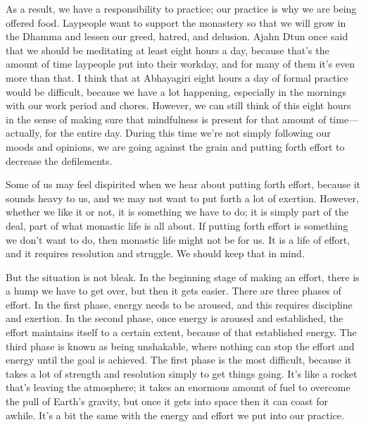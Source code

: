 As a result, we have a responsibility to practice; our practice is why 
we are being offered food. Laypeople want to support the monastery so 
that we will grow in the Dhamma and lessen our greed, hatred, and 
delusion. Ajahn Dtun once said that we should be meditating at least 
eight hours a day, because that's the amount of time laypeople put into 
their workday, and for many of them it's even more than that. I think 
that at Abhayagiri eight hours a day of formal practice would be 
difficult, because we have a lot happening, especially in the mornings 
with our work period and chores. However, we can still think of this 
eight hours in the sense of making sure that mindfulness is present for 
that amount of time---actually, for the entire day. During this time 
we're not simply following our moods and opinions, we are going against 
the grain and putting forth effort to decrease the defilements.

Some of us may feel dispirited when we hear about putting forth effort, 
because it sounds heavy to us, and we may not want to put forth a lot 
of exertion. However, whether we like it or not, it is something we 
have to do; it is simply part of the deal, part of what monastic life 
is all about. If putting forth effort is something we don't want to do, 
then monastic life might not be for us. It is a life of effort, and it 
requires resolution and struggle. We should keep that in mind.

But the situation is not bleak. In the beginning stage of making an 
effort, there is a hump we have to get over, but then it gets easier. 
There are three phases of effort. In the first phase, energy needs to 
be aroused, and this requires discipline and exertion. In the second 
phase, once energy is aroused and established, the effort maintains 
itself to a certain extent, because of that established energy. The 
third phase is known as being unshakable, where nothing can stop the 
effort and energy until the goal is achieved. The first phase is the 
most difficult, because it takes a lot of strength and resolution 
simply to get things going. It's like a rocket that's leaving the 
atmosphere; it takes an enormous amount of fuel to overcome the pull of 
Earth's gravity, but once it gets into space then it can coast for 
awhile. It's a bit the same with the energy and effort we put into our 
practice.

